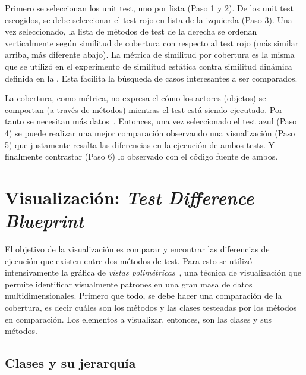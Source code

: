 \par Primero se seleccionan los unit test, uno por lista (Paso 1 y 2). De los unit test escogidos, se debe seleccionar el test rojo en lista de la izquierda (Paso 3). Una vez seleccionado, la lista de métodos de test de la derecha se ordenan verticalmente según similitud de cobertura con respecto al test rojo (más similar arriba, más diferente abajo). La métrica de similitud por cobertura es la misma que se utilizó en el experimento de similitud estática contra similitud dinámica definida en la . Esta facilita la búsqueda de casos interesantes a ser comparados. 

\par La cobertura, como métrica, no expresa el cómo los actores (objetos) se comportan (a través de métodos) mientras el test está siendo ejecutado. Por tanto se necesitan más datos~\cite{van2001refactoring,greiler2012test}. Entonces, una vez seleccionado el test azul (Paso 4) se puede realizar una mejor comparación observando una visualización (Paso 5) que justamente resalta las diferencias en la ejecución de ambos tests. Y finalmente contrastar (Paso 6) lo observado con el código fuente de ambos.



\section{Visualización: \emph{Test Difference Blueprint}}

\par El objetivo de la visualización es comparar y encontrar las diferencias de ejecución que existen entre dos métodos de test. Para esto se utilizó intensivamente la gráfica de \emph{vistas polimétricas}~\cite{Lanz03d}, una técnica de visualización que permite identificar visualmente patrones en una gran masa de datos multidimensionales. Primero que todo, se debe hacer una comparación de la cobertura, es decir cuáles son los métodos y las clases testeadas por los métodos en comparación. Los elementos a visualizar, entonces, son las clases y sus métodos. 

\subsection{Clases y su jerarquía}

